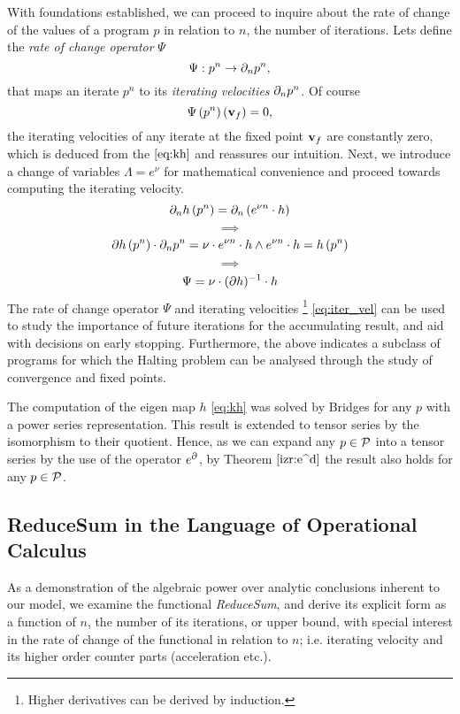 With foundations established, we can proceed to inquire about the rate of change of the values of a program $p$ in relation to $n$, the number of iterations. Lets define the \emph{rate of change operator} $\Psi$ 
  \begin{equation}
    \Psi:p^n\to\partial_np^n,
  \end{equation}
that maps an iterate $p^n$ to its \emph{iterating velocities} $\partial_n p^n$. Of course
  \begin{equation}
  \Psi\left(p^n\right)\left(\mathbf{v}_f\right)=0,
  \end{equation}
the iterating velocities of any iterate at the fixed point $\mathbf{v}_f$ are constantly zero, which is deduced from the $\eqref{eq:kh}$ and reassures our intuition. Next, we introduce a change of variables $\Lambda= e^\nu$ for mathematical convenience and proceed towards computing the iterating velocity.
  $$\partial_nh\left(p^n\right)=\partial_n\left(e^{\nu n}\cdot h\right)$$
  $$\implies$$
  $$\partial h\left(p^n\right)\cdot\partial_np^n=\nu\cdot e^{\nu n}\cdot h \land e^{\nu n}\cdot h=h\left(p^n\right)$$
  $$\implies$$
  \begin{equation}\label{eq:iter_vel}
  \Psi=\nu\cdot(\partial h)^{-1}\cdot h
  \end{equation}
The rate of change operator $\Psi$ and iterating velocities
\footnote{Higher derivatives can be derived by induction.}
\eqref{eq:iter_vel} can be used to study the importance of future iterations for the accumulating result, and aid with decisions on early stopping. Furthermore, the above indicates a subclass of programs for which the Halting problem can be analysed through the study of convergence and fixed points.

The computation of the eigen map $h$ \eqref{eq:kh} was solved by Bridges \cite{bridges2016solution} for any $p$ with a power series representation. This result is extended to tensor series by the isomorphism to their quotient. Hence, as we can expand any $p\in\mathcal{P}$ into a tensor series by the use of the operator $e^\partial$, by Theorem $\ref{izr:e^d}$ the result also holds for any $p\in\mathcal{P}$. 


\subsection{ReduceSum in the Language of Operational Calculus}

As a demonstration of the algebraic power over analytic conclusions inherent to our model, we examine the functional \emph{ReduceSum}, and derive its explicit form as a function of $n$, the number of its iterations, or upper bound, with special interest in the rate of change of the functional in relation to $n$; i.e. iterating velocity and its higher order counter parts (acceleration etc.). 

